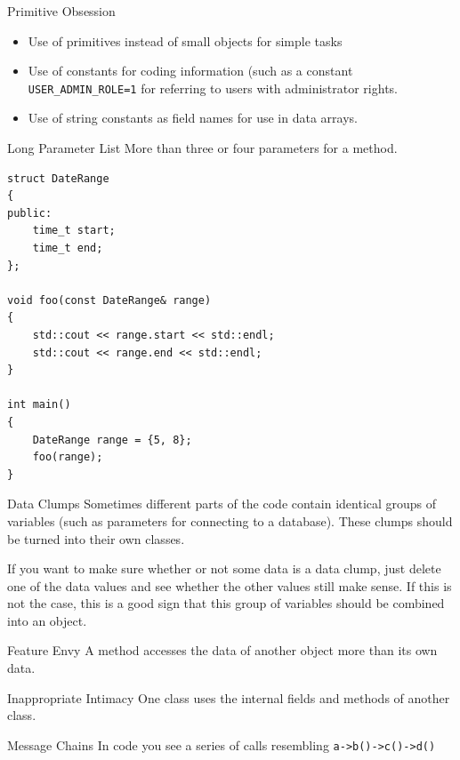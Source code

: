 \documentclass{beamer}
\begin{document}
\begin{frame}{Primitive Obsession}
\begin{itemize}
  \item Use of primitives instead of small objects for simple tasks
  \item Use of constants for coding information (such as a constant
  \lstinline{USER_ADMIN_ROLE=1} for referring to users with administrator
  rights.
  \item Use of string constants as field names for use in data arrays.
\end{itemize}
\end{frame}

\begin{frame}[fragile]{Long Parameter List}
More than three or four parameters for a method.
\begin{lstlisting}
struct DateRange
{
public:
    time_t start;
    time_t end;
};

void foo(const DateRange& range)
{
    std::cout << range.start << std::endl;
    std::cout << range.end << std::endl;
}

int main()
{
    DateRange range = {5, 8};
    foo(range);
}
\end{lstlisting}
\end{frame}

\begin{frame}{Data Clumps}
Sometimes different parts of the code contain identical groups of variables
(such as parameters for connecting to a database). These clumps should be turned
into their own classes. 

If you want to make sure whether or not some data is a data clump, just delete
one of the data values and see whether the other values still make sense. If
this is not the case, this is a good sign that this group of variables should be
combined into an object.
\end{frame}

\begin{frame}{Feature Envy}
A method accesses the data of another object more than its own data.
\end{frame}

\begin{frame}{Inappropriate Intimacy}
One class uses the internal fields and methods of another class.
\end{frame}

\begin{frame}{Message Chains}
In code you see a series of calls resembling \lstinline{a->b()->c()->d()}
\end{frame}
\end{document}
